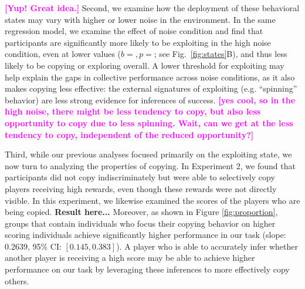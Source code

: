 \documentclass[12pt,letterpaper]{article}
\newcommand{\andrew}[1]{\textcolor{magenta}{\bf [#1]}}
\begin{document}


\andrew{Yup! Great idea.}
Second, we examine how the deployment of these behavioral states may vary with higher or lower noise in the environment. 
In the same regression model, we examine the effect of noise condition and find that participants are significantly more likely to be exploiting in the high noise condition, even at lower values ($b=, p=$; see Fig.~\ref{fig:states}B), and thus less likely to be copying or exploring overall.
A lower threshold for exploiting may help explain the gaps in collective performance across noise conditions, as it also makes copying less effective: the external signatures of exploiting (e.g. ``spinning'' behavior) are less strong evidence for inferences of success. \andrew{yes cool, so in the high noise, there might be less tendency to copy, but also less opportunity to copy due to less spinning.  Wait, can we get at the less tendency to copy, independent of the reduced opportunity?}

Third, while our previous analyses focused primarily on the exploiting state, we now turn to analyzing the properties of copying. 
In Experiment 2, we found that participants did not copy indiscriminately but were able to selectively copy players receiving high rewards, even though these rewards were not directly visible. 
In this experiment, we likewise examined the scores of the players who are being copied.
\textbf{Result here...}
Moreover, as shown in Figure \ref{fig:proportion}, groups that contain individuals who focus their copying behavior on higher scoring individuals achieve significantly higher performance in our task (slope: 0.2639, 95\% CI: $[0.145,  0.383]$). 
A player who is able to accurately infer whether another player is receiving a high score may be able to achieve higher performance on our task by leveraging these inferences to more effectively copy others.
\end{document}
